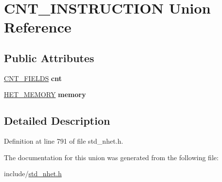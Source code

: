 \hypertarget{unionCNT__INSTRUCTION}{}\section{C\+N\+T\+\_\+\+I\+N\+S\+T\+R\+U\+C\+T\+I\+ON Union Reference}
\label{unionCNT__INSTRUCTION}
\subsection*{Public Attributes}
\begin{DoxyCompactItemize}
\item 
\mbox{\label{unionCNT__INSTRUCTION_afaf22221abad0b9f6ddd3724285221a8}} 
\mbox{\hyperlink{structCNT__format}{C\+N\+T\+\_\+\+F\+I\+E\+L\+DS}} {\bfseries cnt}
\item 
\mbox{\label{unionCNT__INSTRUCTION_ad29123d2f77dac21692d044f7024ca11}} 
\mbox{\hyperlink{structmemory__format}{H\+E\+T\+\_\+\+M\+E\+M\+O\+RY}} {\bfseries memory}
\end{DoxyCompactItemize}


\subsection{Detailed Description}


Definition at line 791 of file std\+\_\+nhet.\+h.



The documentation for this union was generated from the following file\+:\begin{DoxyCompactItemize}
\item 
include/\mbox{\hyperlink{std__nhet_8h}{std\+\_\+nhet.\+h}}\end{DoxyCompactItemize}
